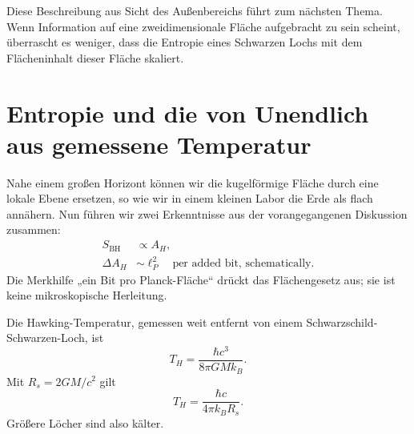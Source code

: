 \begin{classroomqa}
\end{classroomqa}

Diese Beschreibung aus Sicht des Außenbereichs führt zum nächsten Thema. Wenn Information auf eine zweidimensionale Fläche aufgebracht zu sein scheint, überrascht es weniger, dass die Entropie eines Schwarzen Lochs mit dem Flächeninhalt dieser Fläche skaliert.

\section{Entropie und die von Unendlich aus gemessene Temperatur}

Nahe einem großen Horizont können wir die kugelförmige Fläche durch eine lokale Ebene ersetzen, so wie wir in einem kleinen Labor die Erde als flach annähern. Nun führen wir zwei Erkenntnisse aus der vorangegangenen Diskussion zusammen:
\begin{equation}
\begin{aligned}
S_{\mathrm{BH}}&\propto A_H,\\
\Delta A_H&\sim \ell_P^2
\quad\text{per added bit, schematically}.
\end{aligned}
\end{equation}
Die Merkhilfe „ein Bit pro Planck-Fläche“ drückt das Flächengesetz aus; sie ist keine mikroskopische Herleitung.

Die Hawking-Temperatur, gemessen weit entfernt von einem Schwarzschild-Schwarzen-Loch, ist
\begin{equation}
T_H=\frac{\hbar c^3}{8\pi GMk_B}.
\label{eq:l05-hawking}
\end{equation}
Mit \(R_s=2GM/c^2\) gilt
\begin{equation}
T_H=\frac{\hbar c}{4\pi k_B R_s}.
\label{eq:l05-hawking-radius}
\end{equation}
Größere Löcher sind also kälter.

\begin{classroomqa}
\end{classroomqa}

